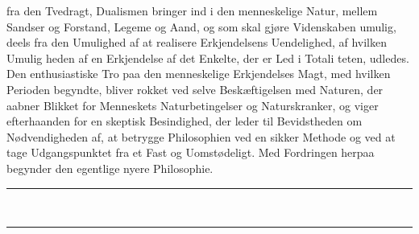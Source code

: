 \documentclass[12pt,a4paper]{book}
\newcommand{\dblrule}{\begin{center}%
  \rule{2cm}{0.4pt}\\[1.2pt]\rule{2cm}{0.4pt}\end{center}}
\begin{document}
fra den Tvedragt, Dualismen bringer ind i den menneskelige
Natur, mellem Sandser og Forstand, Legeme og Aand, og som
skal gjøre Videnskaben umulig, deels fra den Umulighed af
at realisere Erkjendelsens Uendelighed, af hvilken Umulig\-%
heden af en Erkjendelse af det Enkelte, der er Led i Totali\-%
teten, udledes. Den enthusiastiske Tro paa den menneskelige
Erkjendelses Magt, med hvilken Perioden begyndte, bliver
rokket ved selve Beskæftigelsen med Naturen, der aabner
Blikket for Menneskets Naturbetingelser og Naturskranker, og
viger efterhaanden for en skeptisk Besindighed, der leder til
Bevidstheden om Nødvendigheden af, at betrygge Philosophien
ved en sikker Methode og ved at tage Udgangspunktet fra et
Fast og Uomstødeligt. Med Fordringen herpaa begynder den
egentlige nyere Philosophie.

\dblrule
%
\end{document}
